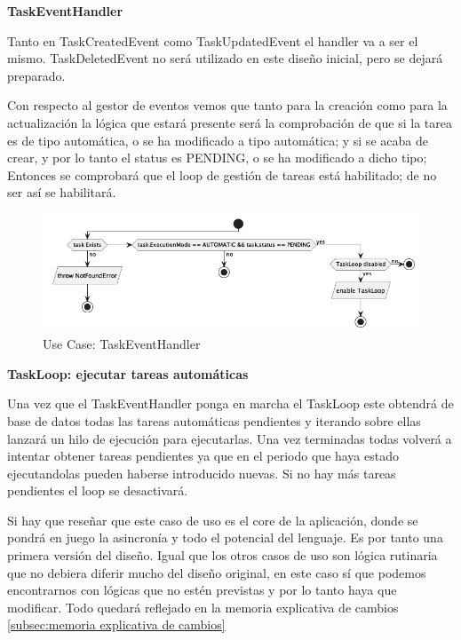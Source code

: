 \textbf{TaskEventHandler}

Tanto en TaskCreatedEvent como TaskUpdatedEvent el handler va a ser el mismo. TaskDeletedEvent no será utilizado en este diseño inicial, pero se dejará preparado.


Con respecto al gestor de eventos vemos que tanto para la creación como para la actualización la lógica que estará presente será la comprobación de que si la tarea es de tipo automática, o se ha modificado a tipo automática; y si se acaba de crear, y por lo tanto el status es PENDING, o se ha modificado a dicho tipo; Entonces se comprobará que el loop de gestión de tareas está habilitado; de no ser así se habilitará.

\begin{figure}[H]
    \centering
    \includegraphics[height=0.2\textheight]{./part/Proyecto_ejecutivo/memoria_descriptiva/descripcionDelProyecto/manager/uml/taskEventHandlerUseCase}
    \caption{Use Case: TaskEventHandler}\label{fig:Use Case-TaskEventHandler}
\end{figure}

\textbf{TaskLoop: ejecutar tareas automáticas}\label{ref:X}

Una vez que el TaskEventHandler ponga en marcha el TaskLoop este obtendrá de base de datos todas las tareas automáticas pendientes y iterando sobre ellas lanzará un hilo de ejecución para ejecutarlas. Una vez terminadas todas volverá a intentar obtener tareas pendientes ya que en el periodo que haya estado ejecutandolas pueden haberse introducido nuevas. Si no hay más tareas pendientes el loop se desactivará.

Si hay que reseñar que este caso de uso es el core de la aplicación, donde se pondrá en juego la asincronía y todo el potencial del lenguaje. Es por tanto una primera versión del diseño. Igual que los otros casos de uso son lógica rutinaria que no debiera diferir mucho del diseño original, en este caso sí que podemos encontrarnos con lógicas que no estén previstas y por lo tanto haya que modificar. Todo quedará reflejado en la memoria explicativa de cambios \ref{subsec:memoria explicativa de cambios}


